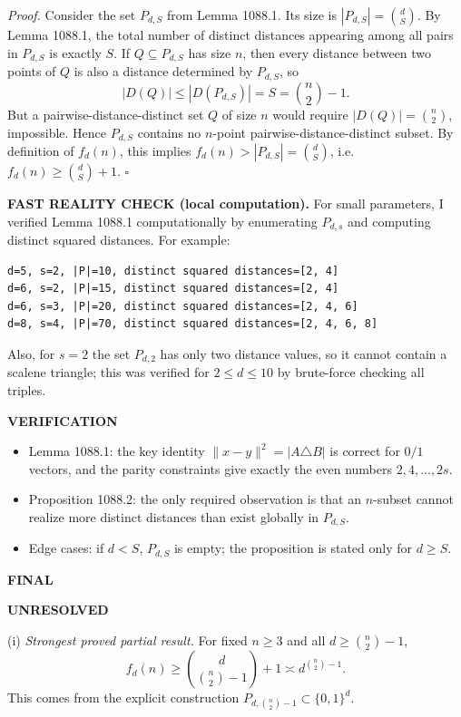 \emph{Proof.}
Consider the set $P_{d,S}$ from Lemma 1088.1. Its size is $|P_{d,S}|=\binom{d}{S}$.
By Lemma 1088.1, the total number of distinct distances appearing among all pairs in $P_{d,S}$ is exactly $S$.
If $Q\subseteq P_{d,S}$ has size $n$, then every distance between two points of $Q$ is also a distance determined by $P_{d,S}$, so
\[|D(Q)|\le |D(P_{d,S})| = S = \binom{n}{2}-1.
\]
But a pairwise-distance-distinct set $Q$ of size $n$ would require $|D(Q)|=\binom{n}{2}$, impossible. Hence $P_{d,S}$ contains no $n$-point pairwise-distance-distinct subset.
By definition of $f_d(n)$, this implies $f_d(n)>|P_{d,S}|=\binom{d}{S}$, i.e. $f_d(n)\ge \binom{d}{S}+1$.
\hfill$\square$

\textbf{FAST REALITY CHECK (local computation).}
For small parameters, I verified Lemma 1088.1 computationally by enumerating $P_{d,s}$ and computing distinct squared distances.
For example:
\begin{verbatim}
d=5, s=2, |P|=10, distinct squared distances=[2, 4]
d=6, s=2, |P|=15, distinct squared distances=[2, 4]
d=6, s=3, |P|=20, distinct squared distances=[2, 4, 6]
d=8, s=4, |P|=70, distinct squared distances=[2, 4, 6, 8]
\end{verbatim}
Also, for $s=2$ the set $P_{d,2}$ has only two distance values, so it cannot contain a scalene triangle; this was verified for $2\le d\le 10$ by brute-force checking all triples.

\textbf{VERIFICATION}

\begin{itemize}
\item Lemma 1088.1: the key identity $\|x-y\|^2=|A\triangle B|$ is correct for $0/1$ vectors, and the parity constraints give exactly the even numbers $2,4,\dots,2s$.
\item Proposition 1088.2: the only required observation is that an $n$-subset cannot realize more distinct distances than exist globally in $P_{d,S}$.
\item Edge cases: if $d<S$, $P_{d,S}$ is empty; the proposition is stated only for $d\ge S$.
\end{itemize}

\textbf{FINAL}

\textbf{UNRESOLVED}

(i) \emph{Strongest proved partial result.} For fixed $n\ge 3$ and all $d\ge \binom{n}{2}-1$,
\[f_d(n)\ge \binom{d}{\binom{n}{2}-1}+1\asymp d^{\binom{n}{2}-1}.
\]
This comes from the explicit construction $P_{d,\binom{n}{2}-1}\subset\{0,1\}^d$.

